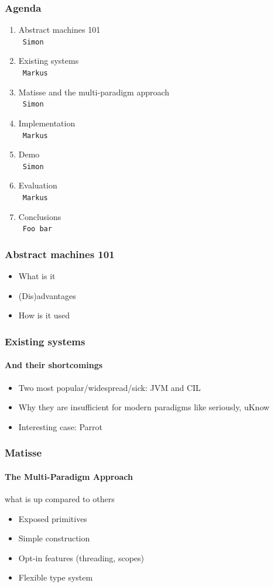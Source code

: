 \documentclass[handout]{beamer}
\newcommand{\n}[1]{\\~\texttt{\color{red}\tiny #1}}
\begin{document}
\begin{frame}
  \frametitle{Agenda}
  \fontsize{11pt}{20}\selectfont
  \begin{enumerate}
  \item Abstract machines 101
    \n{Simon}
    \pause{}
  \item Existing systems
    \n{Markus}
    \pause{}
  \item Matisse and the multi-paradigm approach
    \n{Simon}
    \pause{}
  \item Implementation
    \n{Markus}
    \pause{}
  \item Demo
    \n{Simon}
    \pause{}
  \item Evaluation
    \n{Markus}
    \pause{}
  \item Conclusions
    \n{Foo bar}
  \end{enumerate}
\end{frame}

\begin{frame}
  \frametitle{Abstract machines 101}

  \begin{itemize}
  \item What is it
  \item (Dis)advantages
  \item How is it used
  \end{itemize}
\end{frame}

\begin{frame}
  \frametitle{Existing systems}
  \framesubtitle{And their shortcomings}

  \begin{itemize}
  \item Two most popular/widespread/sick: JVM and CIL
  \item Why they are insufficient for modern paradigms like seriously, uKnow
  \item Interesting case: Parrot
  \end{itemize}
\end{frame}

\begin{frame}
  \frametitle{Matisse}
  \framesubtitle{The Multi-Paradigm Approach}

  what is up compared to others
  \begin{itemize}
  \item Exposed primitives
  \item Simple construction
  \item Opt-in features (threading, scopes)
  \item Flexible type system
  \end{itemize}
\end{frame}
\end{document}
